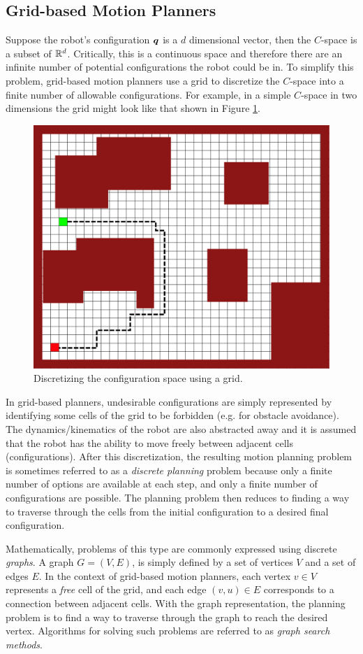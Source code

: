 \subsection{Grid-based Motion Planners}
Suppose the robot's configuration $\bm{q}$ is a $d$ dimensional vector, then the $C$-space is a subset of $\mathbb{R}^d$. Critically, this is a continuous space and therefore there are an infinite number of potential configurations the robot could be in. To simplify this problem, grid-based motion planners use a grid to discretize the $C$-space into a finite number of allowable configurations. For example, in a simple $C$-space in two dimensions the grid might look like that shown in Figure \ref{fig:grid}.
\begin{figure}[ht] 
    \centering 
    \includegraphics[width=0.65\linewidth]{tex/figs/ch06_figs/2d_ws_grid.png}
    \caption{Discretizing the configuration space using a grid.}
    \label{fig:grid} 
\end{figure} 
In grid-based planners, undesirable configurations are simply represented by identifying some cells of the grid to be forbidden (e.g. for obstacle avoidance). The dynamics/kinematics of the robot are also abstracted away and it is assumed that the robot has the ability to move freely between adjacent cells (configurations).
After this discretization, the resulting motion planning problem is sometimes referred to as a \textit{discrete planning} problem because only a finite number of options are available at each step, and only a finite number of configurations are possible. The planning problem then reduces to finding a way to traverse through the cells from the initial configuration to a desired final configuration.

Mathematically, problems of this type are commonly expressed using discrete \textit{graphs}. A graph $G = (V,E)$, is simply defined by a set of vertices $V$ and a set of edges $E$. In the context of grid-based motion planners, each vertex $v \in V$ represents a \textit{free} cell of the grid, and each edge $(v,u) \in E$ corresponds to a connection between adjacent cells. With the graph representation, the planning problem is to find a way to traverse through the graph to reach the desired vertex. Algorithms for solving such problems are referred to as \textit{graph search methods}.

